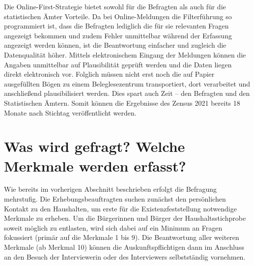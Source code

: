 Die Online-First-Strategie bietet sowohl für die Befragten als auch für die statistischen Ämter Vorteile. Da bei Online-Meldungen die Filterführung so programmiert ist, dass die Befragten lediglich die für sie relevanten Fragen angezeigt bekommen und zudem Fehler unmittelbar während der Erfassung angezeigt werden können, ist die Beantwortung einfacher und zugleich die Datenqualität höher. Mittels elektronischem Eingang der Meldungen können die Angaben unmittelbar auf Plausibilität geprüft werden und die Daten liegen direkt elektronisch vor. Folglich müssen nicht erst noch die auf Papier ausgefüllten Bögen zu einem Beleglesezentrum transportiert, dort verarbeitet und anschließend plausibilisiert werden. Dies spart auch Zeit – den Befragten und den Statistischen Ämtern. Somit können die Ergebnisse des Zensus 2021 bereits 18 Monate nach Stichtag veröffentlicht werden.\par

\section{Was wird gefragt? Welche Merkmale werden erfasst?}
Wie bereits im vorherigen Abschnitt beschrieben erfolgt die Befragung mehrstufig. Die Erhebungsbeauftragten suchen zunächst den persönlichen Kontakt zu den Haushalten, um erste für die Existenzfeststellung notwendige Merkmale zu erheben. Um die Bürgerinnen und Bürger der Haushaltsstichprobe soweit möglich zu entlasten, wird sich dabei auf ein Minimum an Fragen fokussiert (primär auf die Merkmale 1 bis 9). Die Beantwortung aller weiteren Merkmale (ab Merkmal 10) können die Auskunftspflichtigen dann im Anschluss an den Besuch der Interviewerin oder des Interviewers selbstständig vornehmen.\par

